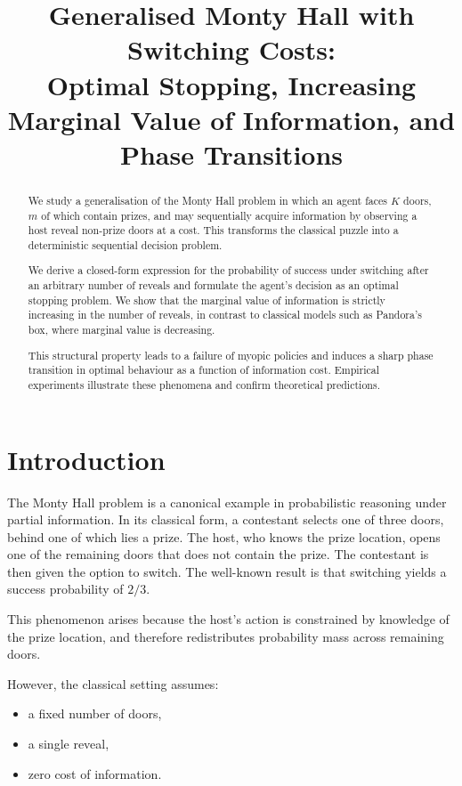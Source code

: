 \documentclass[11pt]{article}
\title{Generalised Monty Hall with Switching Costs:\\
Optimal Stopping, Increasing Marginal Value of Information, and Phase Transitions}
\author{}
\date{}
\begin{document}
\maketitle

\begin{abstract}
We study a generalisation of the Monty Hall problem in which an agent faces $K$ doors, $m$ of which contain prizes, and may sequentially acquire information by observing a host reveal non-prize doors at a cost. This transforms the classical puzzle into a deterministic sequential decision problem.  

We derive a closed-form expression for the probability of success under switching after an arbitrary number of reveals and formulate the agent’s decision as an optimal stopping problem. We show that the marginal value of information is strictly increasing in the number of reveals, in contrast to classical models such as Pandora’s box, where marginal value is decreasing.  

This structural property leads to a failure of myopic policies and induces a sharp phase transition in optimal behaviour as a function of information cost. Empirical experiments illustrate these phenomena and confirm theoretical predictions.
\end{abstract}

\section{Introduction}

The Monty Hall problem is a canonical example in probabilistic reasoning under partial information. In its classical form, a contestant selects one of three doors, behind one of which lies a prize. The host, who knows the prize location, opens one of the remaining doors that does not contain the prize. The contestant is then given the option to switch. The well-known result is that switching yields a success probability of $2/3$.

This phenomenon arises because the host’s action is constrained by knowledge of the prize location, and therefore redistributes probability mass across remaining doors.

However, the classical setting assumes:
\begin{itemize}
\item a fixed number of doors,
\item a single reveal,
\item zero cost of information.
\end{itemize}
\end{document}
